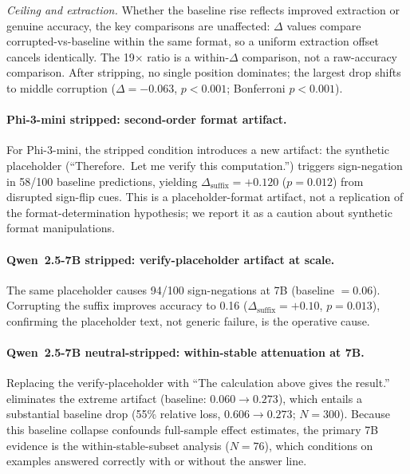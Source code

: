 \documentclass{article}
\theoremstyle{definition}
\theoremstyle{definition}
\begin{document}
\emph{Ceiling and extraction.} Whether the baseline rise reflects improved
extraction or genuine accuracy, the key comparisons are unaffected:
$\Delta$ values compare corrupted-vs-baseline within the same format, so
a uniform extraction offset cancels identically. The 19$\times$ ratio is
a within-$\Delta$ comparison, not a raw-accuracy comparison.
After stripping, no single position dominates; the largest drop shifts to
middle corruption ($\Delta = -0.063$, $p < 0.001$; Bonferroni $p < 0.001$).

\paragraph{Phi-3-mini stripped: second-order format artifact.}
For Phi-3-mini, the stripped condition introduces a new artifact:
the synthetic placeholder (``Therefore.\ Let me verify this computation.'')
triggers sign-negation in 58/100 baseline predictions, yielding
$\Delta_\text{suffix}{=}+0.120$ ($p=0.012$) from disrupted sign-flip cues.
This is a placeholder-format artifact, not a replication of the
format-determination hypothesis; we report it as a caution about synthetic
format manipulations.

\paragraph{Qwen~2.5-7B stripped: verify-placeholder artifact at scale.}
The same placeholder causes 94/100 sign-negations at 7B (baseline $= 0.06$).
Corrupting the suffix improves accuracy to 0.16
($\Delta_\text{suffix}{=}+0.10$, $p{=}0.013$), confirming the placeholder
text, not generic failure, is the operative cause.

\paragraph{Qwen~2.5-7B neutral-stripped: within-stable attenuation at 7B.}
Replacing the verify-placeholder with ``The calculation above gives the
result.'' eliminates the extreme artifact (baseline: $0.060 \to 0.273$),
which entails a substantial baseline drop (55\% relative loss, $0.606 \to 0.273$; $N{=}300$).
Because this baseline collapse confounds full-sample effect estimates, the
primary 7B evidence is the within-stable-subset analysis ($N{=}76$),
which conditions on examples answered correctly with or without the answer line.
\end{document}
